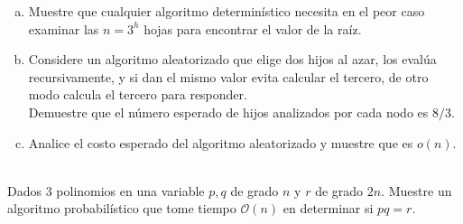 \documentclass[dcc,uchile]{fcfmcourse}
\theoremstyle{plain}
\theoremstyle{definition}
\begin{document}
\begin{problems}
\begin{enumerate}[a)]
    \item Muestre que cualquier algoritmo determinístico necesita en el peor caso examinar las $n=3^h$ hojas para encontrar el valor de la raíz.
    \item Considere un algoritmo aleatorizado que elige dos hijos al azar, los evalúa recursivamente, y si dan el mismo valor evita calcular el tercero, de otro modo calcula el tercero para responder.\\
    Demuestre que el número esperado de hijos analizados por cada nodo es $8/3$.
    \item Analice el costo esperado del algoritmo aleatorizado y muestre que es $o(n)$.
\end{enumerate}
\\
Dados 3 polinomios en una variable $p, q$ de grado $n$ y $r$ de grado $2n$. Muestre un algoritmo probabilístico que tome tiempo $\mathcal{O}(n)$ en determinar si $pq = r$.
\end{problems}
\end{document}
